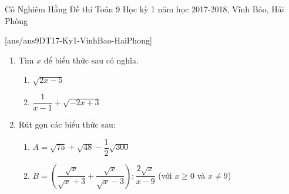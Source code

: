 
\begin{name}
{Cô Nghiêm Hằng}
{Đề thi Toán 9 Học kỳ 1 năm học 2017-2018, Vĩnh Bảo, Hải Phòng }
\end{name}
\setcounter{ex}{0}
[ans/ans9DT17-Ky1-VinhBao-HaiPhong]
\begin{ex}%
    \begin{enumerate}[1.] 
    \item Tìm $x$ để biểu thức sau có nghĩa.
        \begin{enumerate}
            \item $\sqrt{2x-5}$ 
            \item $\dfrac{1}{x-1}+\sqrt{-2x+3}$
        \end{enumerate}
    \item  Rút gọn các biểu thức sau:
        \begin{enumerate}
            \item $A=\sqrt{75}+\sqrt{48}-\dfrac{1}{2}\sqrt{300}$
            \item $B=\left(\dfrac{\sqrt{x}}{\sqrt{x}+3}+\dfrac{\sqrt{x}}{\sqrt{x}-3}\right):\dfrac{2\sqrt{x}}{x-9}$ (với $x \geq 0$ và $x \neq 9$)
        \end{enumerate}
    \end{enumerate}    
\end{ex}

